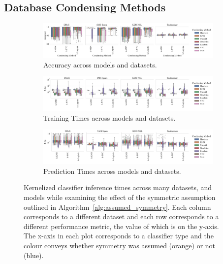 \documentclass{article}
\begin{document}
\subsection{Database Condensing Methods}

\begin{figure}[t]
    \centering
    \begin{subfigure}[t]{\textwidth}
        \includegraphics[width=\textwidth]{figs/combined/condensing_methods_vs_accuracy.pdf}
        \caption{Accuracy across models and datasets.}
        \label{fig:condense_acc}
    \end{subfigure}
    \begin{subfigure}[t]{\textwidth}
        \centering
        \includegraphics[width=\textwidth]{figs/combined/condensing_methods_vs_train_time.pdf}
        \caption{Training Times across models and datasets.}
        \label{fig:sym_train_time}
    \end{subfigure}
    \begin{subfigure}[t]{\textwidth}
        \includegraphics[width=\textwidth]{figs/combined/condensing_methods_vs_predict_time.pdf}
        \caption{Prediction Times across models and datasets.}
        \label{fig:sym_pred_time}
    \end{subfigure}
    \caption{Kernelized classifier inference times across many datasets, and models while examining the effect of the symmetric assumption outlined in Algorithm~\ref{alg:assumed_symmetry}. Each column corresponds to a different dataset and each row corresponds to a different performance metric, the value of which is on the y-axis. The x-axis in each plot corresponds to a classifier type and the colour conveys whether symmetry was assumed (orange) or not (blue).}
    \label{fig:condense_summary}
\end{figure}
\end{document}
